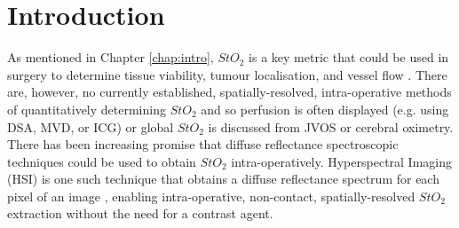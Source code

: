 
% 
\section{Introduction}\label{sec:intro}
As mentioned in Chapter \ref{chap:intro}, $StO_2$ 
is a key metric that could be used in surgery to determine tissue viability, tumour localisation, and vessel flow \cite{Takami2017, Hughes2019, Richardson2023}.
There are, however, no currently established, spatially-resolved, intra-operative methods of quantitatively determining $StO_2$ and so perfusion is often displayed (e.g. using DSA, MVD, or ICG) or global $StO_2$ is discussed from JVOS or cerebral oximetry.
There has been increasing promise that diffuse reflectance spectroscopic techniques could be used to obtain $StO_2$ intra-operatively. Hyperspectral Imaging (HSI) is one such technique that obtains a diffuse reflectance spectrum for each pixel of an image \cite{Kulcke2018, Taylor-Williams2022}, enabling intra-operative, non-contact, spatially-resolved $StO_2$ extraction without the need for a contrast agent. 

